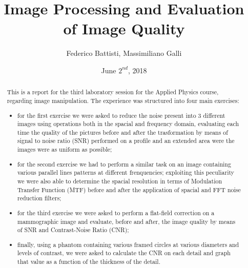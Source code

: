 \documentclass[a4paper]{article}
\begin{document}
\title{Image Processing and Evaluation of Image Quality}
\author{Federico Battisti, Massimiliano Galli}
\date{June $2^{nd}$, 2018}
\maketitle

\begin{abstract}
	This is a report for the third laboratory session for the Applied Physics course, regarding image manipulation. The experience was structured into four main exercises:
	\begin{itemize}
		\item for the first exercise we were asked to reduce the noise present into 3 different images using operations both in the spacial and frequency domain, evaluating each time the quality of the pictures before and after the trasformation by means of signal to noise ratio (SNR) performed on a profile and an extended area were the images were as uniform as possible;
    \item for the second exercise we had to perform a similar task on an image containing various parallel lines patterns at different frenquencies; exploiting this peculiarity we were also able to determine the spacial resolution in terms of Modulation Transfer Function (MTF) before and after the application of spacial and FFT noise reduction filters;
		\item for the third exercise we were asked to perform a flat-field correction on a mammographic image and evaluate, before and after, the image quality by means of SNR and Contrast-Noise Ratio (CNR);
    \item finally, using a phantom containing various framed circles at various diameters and levels of contrast, we were asked to calculate the CNR on each detail and graph that value as a function of the thickness of the detail.
	\end{itemize}
\end{abstract}

\clearpage
\end{document}
